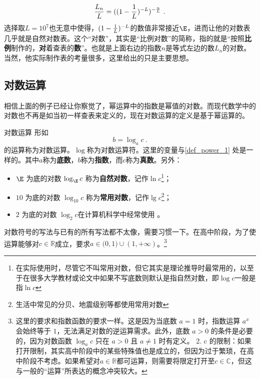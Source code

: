 \begin{equation}
{L_n\over L}=((1-{1\over L})^{-L})^{-{n\over L}}~.
\end{equation}
选择取$L=10^7$也无意中使得，$(1-{1\over L})^{-L}$的数值非常接近$\E$，进而让他的对数表几乎就是自然对数表。这个“对数”，其实是“比例对数”的简称，指的就是“按照\textbf{比例}制作的，\textbf{对}着查表的\textbf{数}”。也就是上面右边的指数$n$是等式左边的数$L_n$的对数。当然，他实际制作表的考量很多，这里给出的只是主要思想。

\subsection{对数运算}

相信上面的例子已经让你察觉了，幂运算中的指数是幂值的对数。而现代数学中的对数也不再是如当初一样查表来定义的，现在对数运算的定义是基于幂运算的。

\begin{definition}{对数运算}
形如
\begin{equation}
b=\log_ac~.
\end{equation}
的运算称为对数运算。$\log$称为对数运算符。这里的变量与\autoref{def_power_1} 处是一样的。其中$a$称为\textbf{底数}，$b$称为\textbf{指数}，而$c$称为\textbf{真数}。另外：
\begin{itemize}
\item $\E$ 为底的对数 $\log_{\E} c$ 称为\textbf{自然对数}，记作$\ln c$\footnote{在实际使用时，尽管它不叫常用对数，但它其实是理论推导时最常用的，以至于在很多大学教材或论文中如果不写底数则默认是指自然对数，即$\log c$一般是指$\ln c$}；
\item $10$ 为底的对数 $\log_{10} c$ 称为\textbf{常用对数}，记作$\lg c$\footnote{生活中常见的分贝、地震级别等都使用常用对数}；
\item $2$ 为底的对数 $\log_{2} c$在计算机科学中经常使用 。
\end{itemize}
\end{definition}

对数符号的写法与已有的所有写法都不太像，需要习惯一下。在高中阶段，为了使运算能够对$c\in\mathbb{R}$成立，要求$a\in\mathbb (0,1)\cup(1,+\infty)$。\footnote{这里的要求和指数函数的要求一样。这是因为当底数  $a = 1$  时，指数运算  $a^x$  会始终等于 $1$，无法满足对数的逆运算需求。此外，底数  $a > 0$  的条件是必要的，因为对数函数  $\log_a c$  只在  $a > 0$  且  $a \neq 1$  时有定义。
	2.	 c \in {}  的限制：如果打开限制，其实高中阶段中的某些特殊值也是成立的，但因为过于繁琐，在高中阶段不考虑。如果希望对$a\in \mathbb{R}$都可运算，则需要将限定打开至$c\in\mathbb{C}$，但这与一般的“运算”所表达的概念冲突较大。}

